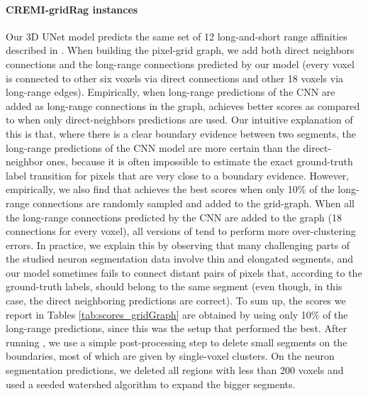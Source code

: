 \paragraph{CREMI-gridRag instances} 
Our 3D UNet model predicts the same set of 12 long-and-short range affinities described in \cite{lee2017superhuman}. 
When building the pixel-grid graph, we add both direct neighbors connections and the long-range connections predicted by our model (every voxel is connected to other six voxels via direct connections and other 18 voxels via long-range edges).
Empirically, when long-range predictions of the CNN are added as long-range connections in the graph, \algname{} achieves better scores as compared to when only direct-neighbors predictions are used.
Our intuitive explanation of this is that, where there is a clear boundary evidence between two segments, the long-range predictions of the CNN model are more certain than the direct-neighbor ones, because it is often impossible to estimate the exact ground-truth label transition for pixels that are very close to a boundary evidence. 
However, empirically, we also find that \algname{} achieves the best scores when only 10\% of the long-range connections are randomly sampled and added to the grid-graph. When all the long-range connections predicted by the CNN are added to the graph (18 connections for every voxel), all versions of \algname{} tend to perform more over-clustering errors.
In practice, we explain this by observing that many challenging parts of the studied neuron segmentation data involve thin and elongated segments, and our model sometimes fails to connect distant pairs of pixels that, according to the ground-truth labels, should belong to the same segment (even though, in this case, the direct neighboring predictions are correct).
To sum up, the scores we report in Tables \ref{tab:scores_gridGraph} are obtained by using only 10\% of the long-range predictions, since this was the setup that performed the best.
After running \algname{}, we use a simple post-processing step to delete small segments on the boundaries, most of which are given by single-voxel clusters. On the neuron segmentation predictions, we deleted all regions with less than 200 voxels and used a seeded watershed algorithm to expand the bigger segments.



